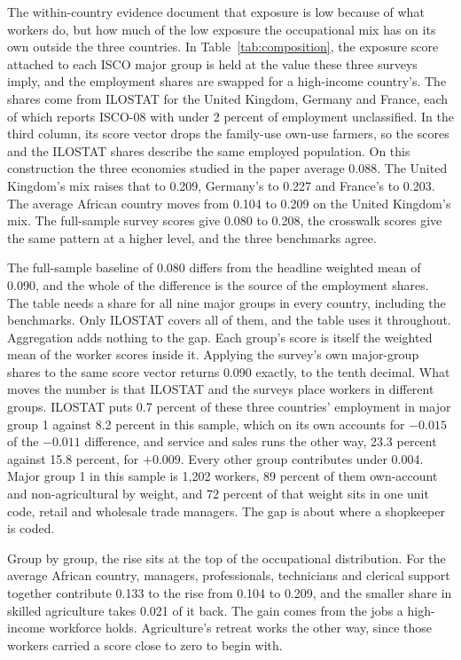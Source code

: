 The within-country evidence document that exposure is low because of what 
workers do, but how much of the low exposure the occupational mix has on its own 
outside the three countries.
In Table~\ref{tab:composition}, the exposure score attached to each ISCO
major group is held at the value these three surveys imply, and the employment
shares are swapped for a high-income country's. The shares come from ILOSTAT
for the United Kingdom, Germany and France, each of which reports ISCO-08 with
under 2 percent of employment unclassified. In the third column, 
its score vector drops the family-use own-use farmers, so the scores and the
ILOSTAT shares describe the same employed population. On this construction the
three economies studied in the paper average 0.088. The United Kingdom's mix raises
that to 0.209, Germany's to 0.227 and France's to 0.203. The average African
country moves from 0.104 to 0.209 on the United Kingdom's mix. The full-sample
survey scores give 0.080 to 0.208, the crosswalk scores give the same pattern
at a higher level, and the three benchmarks agree.

The full-sample baseline of 0.080 differs from the headline weighted mean of 0.090, and the
whole of the difference is the source of the employment shares. The table needs
a share for all nine major groups in every country, including the benchmarks.
Only ILOSTAT covers all of them, and the table uses it throughout. Aggregation
adds nothing to the gap. Each group's score is itself the weighted mean of the
worker scores inside it. Applying the survey's own major-group shares to the
same score vector returns 0.090 exactly, to the tenth decimal. What moves the number is that
ILOSTAT and the surveys place workers in different groups. ILOSTAT puts 0.7
percent of these three countries' employment in major group 1 against 8.2
percent in this sample, which on its own accounts for $-0.015$ of the
$-0.011$ difference, and service and sales runs the other way, 23.3 percent
against 15.8 percent, for $+0.009$. Every other group contributes under 0.004.
Major group 1 in this sample is 1,202 workers, 89 percent of them own-account
and non-agricultural by weight, and 72 percent of that weight sits in one unit
code, retail and wholesale trade managers. The gap is about where a shopkeeper
is coded.

Group by group, the rise sits at the top of the occupational distribution. For
the average African country, managers, professionals, technicians and clerical
support together contribute 0.133 to the rise from 0.104 to 0.209, and the
smaller share in skilled agriculture takes 0.021 of it back. The gain comes
from the jobs a high-income workforce holds. Agriculture's retreat works the
other way, since those workers carried a score close to zero to begin with.

